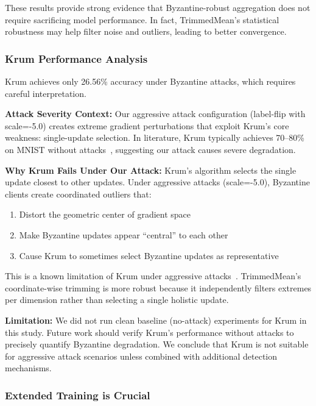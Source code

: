 \documentclass{ieeeaccess}
\begin{document}
These results provide strong evidence that Byzantine-robust aggregation does not require sacrificing model performance. In fact, TrimmedMean's statistical robustness may help filter noise and outliers, leading to better convergence.

\subsubsection{Krum Performance Analysis}

Krum achieves only 26.56\% accuracy under Byzantine attacks, which requires careful interpretation. 

\textbf{Attack Severity Context:} Our aggressive attack configuration (label-flip with scale=-5.0) creates extreme gradient perturbations that exploit Krum's core weakness: single-update selection. In literature, Krum typically achieves 70--80\% on MNIST without attacks~\cite{blanchard2017machine}, suggesting our attack causes severe degradation.

\textbf{Why Krum Fails Under Our Attack:} Krum's algorithm selects the single update closest to other updates. Under aggressive attacks (scale=-5.0), Byzantine clients create coordinated outliers that:
\begin{enumerate}
    \item Distort the geometric center of gradient space
    \item Make Byzantine updates appear ``central'' to each other
    \item Cause Krum to sometimes select Byzantine updates as representative
\end{enumerate}

This is a known limitation of Krum under aggressive attacks~\cite{baruch2019little}. TrimmedMean's coordinate-wise trimming is more robust because it independently filters extremes per dimension rather than selecting a single holistic update. 

\textbf{Limitation:} We did not run clean baseline (no-attack) experiments for Krum in this study. Future work should verify Krum's performance without attacks to precisely quantify Byzantine degradation. We conclude that Krum is not suitable for aggressive attack scenarios unless combined with additional detection mechanisms.

\subsubsection{Extended Training is Crucial}
\end{document}
